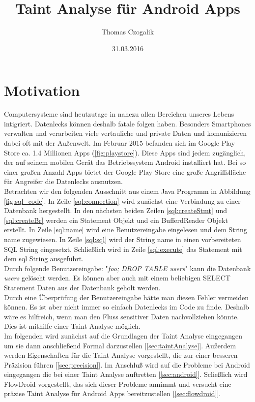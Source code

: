 \documentclass[runningheads]{llncs}
\begin{document}
\mainmatter
\title{Taint Analyse für Android Apps} 
\author{Thomas Czogalik}
\date{31.03.2016}
\maketitle

\section{Motivation} 
Computersysteme sind heutzutage in nahezu allen Bereichen unseres Lebens intigriert. Datenlecks können deshalb fatale folgen haben. Besonders Smartphones verwalten und verarbeiten viele vertauliche und private Daten und komunizieren dabei oft mit der Außenwelt. Im Februar 2015 befanden sich im Google Play Store ca. 1.4 Millionen Apps (\ref{fig:playstore}). Diese Apps sind jedem zugänglich, der auf seinem mobilen Gerät das Betriebssystem Android installiert hat. Bei so einer großen Anzahl Apps bietet der Google Play Store eine große Angriffsfläche für Angreifer die Datenlecks ausnutzen. \\
Betrachten wir den folgenden Ausschnitt aus einem Java Programm in Abbildung \ref{fig:sql_code}. In Zeile \ref{sql:connection} wird zunächst eine Verbindung zu einer Datenbank hergestellt. In den nächsten beiden Zeilen \ref{sql:createStmt} und \ref{sql:createBr} werden ein Statement Objekt und ein BufferdReader Objekt erstellt. In Zeile \ref{sql:name} wird eine Benutzereingabe eingelesen und dem String name zugewiesen. In Zeile \ref{sql:sql} wird der String name in einen vorbereiteten SQL String eingesetzt. Schließlich wird in Zeile \ref{sql:execute} das Statement mit dem sql String ausgeführt. 
\\Durch folgende Benutzereingabe: "\emph{foo; DROP TABLE users}" kann die Datenbank \emph{users} gelöscht werden. Es können aber auch mit einem beliebigen SELECT Statement Daten aus der Datenbank geholt werden. 
\\Durch eine Überprüfung der Benutzereingabe hätte man diesen Fehler vermeiden können. Es ist aber nicht immer so einfach Datenlecks im Code zu finde. 
Deshalb wäre es hilfreich, wenn man den Fluss sensitiver Daten nachvollziehen könnte. Dies ist mithilfe einer Taint Analyse möglich. \\
Im folgenden wird zunächst auf die Grundlagen der Taint Analyse eingegangen um sie dann anschließend Formal darzustellen [\ref{sec:taintAnalyse}]. Außerdem werden Eigenschaften für die Taint Analyse vorgestellt, die zur einer besseren Präzision führen [\ref{sec:precision}]. Im Anschluß wird auf die Probleme bei Android eingegangen die bei einer Taint Analyse auftretten [\ref{sec:android}]. Scließlich wird FlowDroid vorgestellt, das sich dieser Probleme annimmt und versucht eine präzise Taint Analyse für Android Apps bereitzustellen [\ref{sec:flowdroid}].
 
\end{document}
